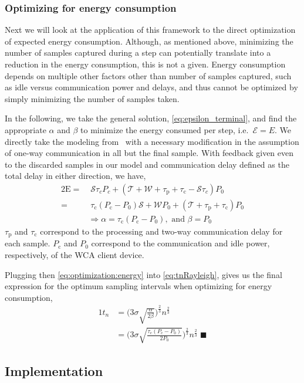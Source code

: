 \subsubsection{Optimizing for energy consumption}

Next we will look at the application of this framework to the direct optimization of expected energy consumption.
Although, as mentioned above, minimizing the number of samples captured during a step can potentially translate into a reduction in the energy consumption, this is not a given.
Energy consumption depends on multiple other factors other than number of samples captured, such as idle versus communication power and delays, and thus cannot be optimized by simply minimizing the number of samples taken.

In the following, we take the general solution, \cref{eq:epsilon_terminal}, and find the appropriate \( \alpha \) and \( \beta \) to minimize the energy consumed per step, i.e.\ \( \mathcal{E}=E \).
We directly take the modeling from~\cite{moothedath2022energy2} with a necessary modification in the assumption of one-way communication in all but the final sample.
With feedback given even to the discarded samples in our model and communication delay defined as the total delay in either direction, we have, 
\begin{alignat}{2}
    \mathrm{E}=&\;\mathcal{S}\tau_cP_c+(\mathcal{T}+\mathcal{W}+\tau_\mathrm{p}+\tau_\mathrm{c}-\mathcal{S}\tau_c)P_0\nonumber\\
    =&\;\tau_{\text{c}}(P_{\text{c}} -P_0)\mathcal{S}+\mathcal{W}P_0+(\mathcal{T}+\tau_{\text{p}} +\tau_{\text{c}}) P_0\nonumber\\
&\Rightarrow \alpha=\tau_{\text{c}}(P_{\text{c}} -P_0),\text{ and }\beta=P_0 \label{eq:optimization:energy}
\end{alignat}
\( \tau_\text{p} \) and \( \tau_\text{c} \) correspond to the processing and two-way communication delay for each sample.
\( P_\text{c} \) and \( P_0 \) correspond to the communication and idle power, respectively, of the \gls{WCA} client device.

Plugging then \cref{eq:optimization:energy} into \cref{eq:tnRayleigh}, gives us the final expression for the optimum sampling intervals when optimizing for energy consumption,
\begin{alignat}{1}
    t_n&=\Big(3\sigma\!\sqrt{\tfrac{\alpha}{2\beta}}\Big)^{\frac{2}{3}}n^{\frac{2}{3}}\nonumber\\
    &=\Big(3\sigma\!\sqrt{\tfrac{\tau_{\text{c}}(P_{\text{c}} -P_0)}{2 P_0}}\Big)^{\frac{2}{3}}n^{\frac{2}{3}}\;\blacksquare\label{eq:tnRayleigh:energy}
\end{alignat}


\subsection{Implementation}
